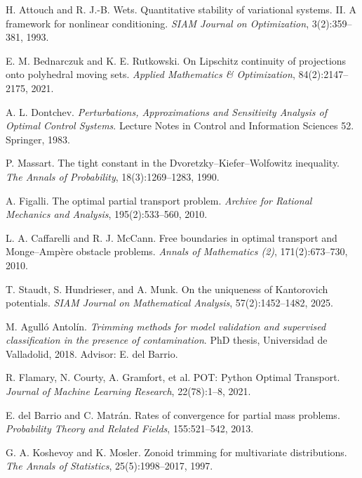 H. Attouch and R. J.-B. Wets.
\newblock Quantitative stability of variational systems. II. A framework for nonlinear conditioning.
\newblock \emph{SIAM Journal on Optimization}, 3(2):359--381, 1993.

E. M. Bednarczuk and K. E. Rutkowski.
\newblock On Lipschitz continuity of projections onto polyhedral moving sets.
\newblock \emph{Applied Mathematics \& Optimization}, 84(2):2147--2175, 2021.

A. L. Dontchev.
\newblock \emph{Perturbations, Approximations and Sensitivity Analysis of Optimal Control Systems}.
\newblock Lecture Notes in Control and Information Sciences 52. Springer, 1983.

P. Massart.
\newblock The tight constant in the Dvoretzky--Kiefer--Wolfowitz inequality.
\newblock \emph{The Annals of Probability}, 18(3):1269--1283, 1990.

A. Figalli.
\newblock The optimal partial transport problem.
\newblock \emph{Archive for Rational Mechanics and Analysis}, 195(2):533--560, 2010.

L. A. Caffarelli and R. J. McCann.
\newblock Free boundaries in optimal transport and Monge--Amp\`ere obstacle problems.
\newblock \emph{Annals of Mathematics (2)}, 171(2):673--730, 2010.

T. Staudt, S. Hundrieser, and A. Munk.
\newblock On the uniqueness of Kantorovich potentials.
\newblock \emph{SIAM Journal on Mathematical Analysis}, 57(2):1452--1482, 2025.

M. Agull{\'o} Antol{\'i}n.
\newblock \emph{Trimming methods for model validation and supervised classification in the presence of contamination}.
\newblock PhD thesis, Universidad de Valladolid, 2018. Advisor: E. del Barrio.

R. Flamary, N. Courty, A. Gramfort, et al.
\newblock POT: Python Optimal Transport.
\newblock \emph{Journal of Machine Learning Research}, 22(78):1--8, 2021.

E. del Barrio and C. Matr{\'a}n.
\newblock Rates of convergence for partial mass problems.
\newblock \emph{Probability Theory and Related Fields}, 155:521--542, 2013.

G. A. Koshevoy and K. Mosler.
\newblock Zonoid trimming for multivariate distributions.
\newblock \emph{The Annals of Statistics}, 25(5):1998--2017, 1997.

